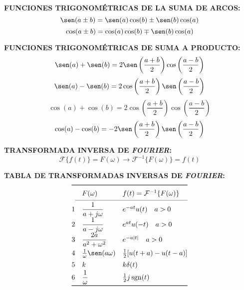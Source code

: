 \documentclass[letter,twoside,8pt]{article}
\DeclareMathOperator{\sgn}{sgn}
\begin{document}
\textbf{FUNCIONES TRIGONOMÉTRICAS DE LA SUMA DE ARCOS:}
\begin{equation*}
    \sen({a}\pm{b})=\sen(a)\cos(b)\pm\sen(b)\cos(a)
\end{equation*}
\begin{equation*}
    \cos({a}\pm{b})=\cos(a)\cos(b)\mp\sen(b)\cos(a)
\end{equation*}

\textbf{FUNCIONES TRIGONOMÉTRICAS DE SUMA A PRODUCTO:}
\begin{equation*}
    \sen(a)+\sen(b)=2\sen\left(\frac{a+b}{2}\right)\cos\left(\frac{a-b}{2}\right)
\end{equation*}
\begin{equation*}
    \sen(a)-\sen(b)=2\cos\left(\frac{a+b}{2}\right)\sen\left(\frac{a-b}{2}\right)
\end{equation*}
\begin{equation*}
    \cos(a)+\cos(b)=2\cos\left(\frac{a+b}{2}\right)\cos\left(\frac{a-b}{2}\right)
\end{equation*}
\begin{equation*}
    \cos(a)-\cos(b)=-2\sen\left(\frac{a+b}{2}\right)\sen\left(\frac{a-b}{2}\right)
\end{equation*}

\textbf{TRANSFORMADA INVERSA DE \emph{FOURIER}:}
\begin{equation*}
    \mathcal{F}\{f(t)\}=F(\omega)\rightarrow\mathcal{F}^{-1}\{F(\omega)\}=f(t)
\end{equation*}

\textbf{TABLA DE TRANSFORMADAS INVERSAS DE \emph{FOURIER}:}
\begin{equation*}
\def\arraystretch{1.4}
\begin{array}{@{}cll@{}}
\toprule
 & F(\omega) & f(t)=\mathcal{F}^{-1}\{F(\omega)\}\\
\cmidrule(l){1-3}
 1 & \dfrac{1}{a+j\omega}
   & e^{-at}u(t)\quad{a}>0\\
 2 & \dfrac{1}{a-j\omega}
   & e^{at}u(-t)\quad{a}>0\\
 3 & \dfrac{2a}{a^2+\omega^2}
   & e^{-a|t|}\quad{a}>0\\
 4 & \frac{1}{\omega}\sen(a\omega)
   & \frac{1}{2}[u(t+a)-u(t-a)]\\
 5 & k
   & k\delta(t)\\
 6 & \dfrac{1}{\omega}
   & \frac{1}{2}j\sgn(t)\\
\bottomrule
\end{array}
\end{equation*}
\end{document}
